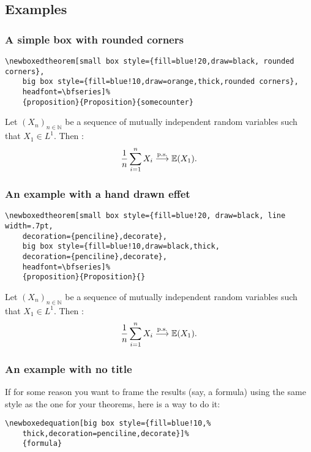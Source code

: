 \documentclass[11pt,oneside]{article}
\begin{document}
\subsection{Examples}


\subsubsection{A simple box with rounded corners}
\begin{verbatim}
\newboxedtheorem[small box style={fill=blue!20,draw=black, rounded corners},
    big box style={fill=blue!10,draw=orange,thick,rounded corners},
    headfont=\bfseries]%
    {proposition}{Proposition}{somecounter}
\end{verbatim}


\begin{proposition}
     Let $(X_n)_{n\in \mathbb{N}}$ be a sequence of mutually independent random 
    variables such that $X_1 \in L^1$. Then :
     \[\frac{1}{n} \sum_{i=1}^n X_i \overset{\textnormal{p.s.}}{\longrightarrow}
         \mathbb{E} (X_1) .\]
\end{proposition}


\subsubsection{An example with a hand drawn effet}

\begin{verbatim}
\newboxedtheorem[small box style={fill=blue!20, draw=black, line width=.7pt,
    decoration={penciline},decorate},
    big box style={fill=blue!10,draw=black,thick,
    decoration={penciline},decorate},
    headfont=\bfseries]%
    {proposition}{Proposition}{}
\end{verbatim}


\begin{propb}
     Let $(X_n)_{n\in \mathbb{N}}$ be a sequence of mutually independent random 
     variables such that $X_1 \in L^1$. Then :
     \[\frac{1}{n} \sum_{i=1}^n X_i \overset{\textnormal{p.s.}}{\longrightarrow}
         \mathbb{E} (X_1) .\]
\end{propb}

\subsubsection{An example with no title}

If for some reason you want to frame the results (say, a formula) using the same 
style as the one for your theorems, here is a way to do it:
\begin{verbatim}
\newboxedequation[big box style={fill=blue!10,%
    thick,decoration=penciline,decorate}]%
    {formula}
\end{verbatim}
\end{document}
